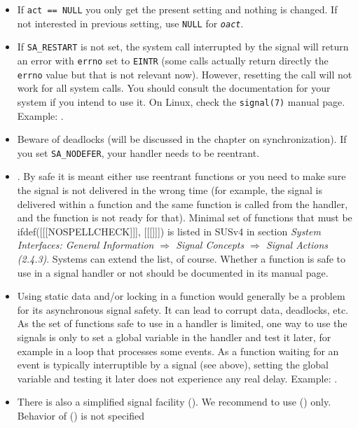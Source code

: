 \begin{itemize}
\item If \texttt{act == NULL} you only get the present setting and nothing is
changed.  If not interested in previous setting, use \texttt{NULL} for
\emph{\texttt{oact}}.
\item If \texttt{SA\_RESTART} is not set, the system call interrupted by the
signal will return an error with \texttt{errno} set to \texttt{EINTR} (some
calls actually return directly the \texttt{errno} value but that is not relevant
now).  However, resetting the call will not work for all system calls.  You
should consult the documentation for your system if you intend to use it.
On Linux, check the \texttt{signal(7)} manual page.  Example:
.
\item Beware of deadlocks (will be discussed in the chapter on synchronization).
If you set \texttt{SA\_NODEFER}, your handler needs to be reentrant.
\item \label{ASYNCSIGNALSAFE} .  By safe it is meant either use reentrant functions or you need
to make sure the signal is not delivered in the wrong time (for example, the
signal is delivered within a function and the same function is called from the
handler, and the function is not ready for that).  Minimal set of functions
that must be ifdef([[[NOSPELLCHECK]]], [[[]]])
is listed in SUSv4 in section
\emph{System Interfaces: General Information $\Rightarrow$ Signal Concepts
$\Rightarrow$ Signal Actions (2.4.3)}.  Systems can extend the list, of course.
Whether a function is safe to use in a signal handler or not should be
documented in its manual page.
\item Using static data and/or locking in a function would generally be a
problem for its asynchronous signal safety.  It can lead to corrupt data,
deadlocks, etc.  As the set of functions safe to use in a handler is limited,
one way to use the signals is only to set a global variable in the handler and
test it later, for example in a loop that processes some events.  As a function
waiting for an event is typically interruptible by a signal (see above), setting
the global variable and testing it later does not experience any real delay.
Example: .
\item There is also a simplified signal facility ().  We recommend
to use () only.  Behavior of () is not specified

\end{itemize}
